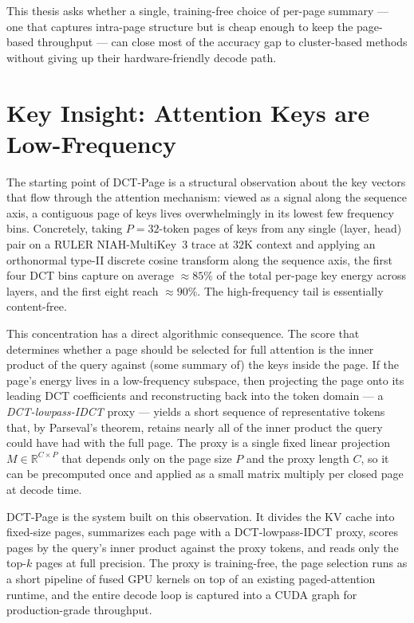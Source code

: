 This thesis asks whether a single, training-free choice of per-page
summary --- one that captures intra-page structure but is cheap
enough to keep the page-based throughput --- can close most of the
accuracy gap to cluster-based methods without giving up their
hardware-friendly decode path.


\section{Key Insight: Attention Keys are Low-Frequency}\label{sec:intro-insight}

The starting point of DCT-Page is a structural observation about the
key vectors that flow through the attention mechanism: viewed as a
signal along the sequence axis, a contiguous page of keys lives
overwhelmingly in its lowest few frequency bins.  Concretely, taking
$P{=}32$-token pages of keys from any single (layer, head) pair on a
RULER NIAH-MultiKey~3 trace at $32$K context and applying an
orthonormal type-II discrete cosine transform along the sequence
axis, the first four DCT bins capture on average $\approx 85\%$ of
the total per-page key energy across layers, and the first eight
reach $\approx 90\%$.  The high-frequency tail is essentially
content-free.

This concentration has a direct algorithmic consequence.  The score
that determines whether a page should be selected for full attention
is the inner product of the query against (some summary of) the keys
inside the page.  If the page's energy lives in a low-frequency
subspace, then projecting the page onto its leading DCT coefficients
and reconstructing back into the token domain --- a
\emph{DCT-lowpass-IDCT} proxy --- yields a short sequence of
representative tokens that, by Parseval's theorem, retains nearly all
of the inner product the query could have had with the full page.
The proxy is a single fixed linear projection $M \in \mathbb{R}^{C
\times P}$ that depends only on the page size $P$ and the proxy
length $C$, so it can be precomputed once and applied as a small
matrix multiply per closed page at decode time.

DCT-Page is the system built on this observation.  It divides the KV
cache into fixed-size pages, summarizes each page with a
DCT-lowpass-IDCT proxy, scores pages by the query's inner product
against the proxy tokens, and reads only the top-$k$ pages at full
precision.  The proxy is training-free, the page selection runs as a
short pipeline of fused GPU kernels on top of an existing
paged-attention runtime, and the entire decode loop is captured into
a CUDA graph for production-grade throughput.



